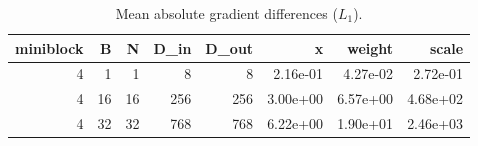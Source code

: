 \begin{table}
\caption{Mean absolute gradient differences ($L_1$).}
\label{tab:mean_grad}
\begin{tabular}{rrrrr|rrr}
\toprule
miniblock & B & N & D_in & D_out & x & weight & scale \\
\midrule
4 & 1 & 1 & 8 & 8 & 2.16e-01 & 4.27e-02 & 2.72e-01 \\
4 & 16 & 16 & 256 & 256 & 3.00e+00 & 6.57e+00 & 4.68e+02 \\
4 & 32 & 32 & 768 & 768 & 6.22e+00 & 1.90e+01 & 2.46e+03 \\
\bottomrule
\end{tabular}
\end{table}
